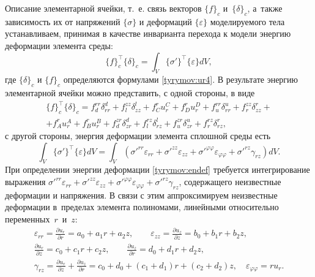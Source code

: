 Описание элементарной ячейки, т.~е. связь векторов $\{f\}_c$  и~$\{\delta\}_c$,  а~также зависимость их от напряжений $\{\sigma\}$ и деформаций $\{\varepsilon\}$  моделируемого тела устанавливаем,
принимая в качестве инварианта перехода к модели энергию деформации элемента среды:
\begin{equation}\label{tyrymov:fd}
    \{f\}_c^\top \{\delta\}_c=\int_V\{\sigma'\}^\top \{\varepsilon\}dV,
\end{equation}
где $\{\delta\}_c$  и $\{f\}_c$   определяются формулами
\eqref{tyrymov:ur4}. В результате энергию элементарной ячейки
можно представить, с одной стороны, в виде
\begin{multline}\label{tyrymov:energ}
   \{f\}_c^\top \{\delta\}_c=f_d^{rr}\delta_{rr}^d+f_l^{zz}\delta_{zz}^l+f_C^{r}u_{r}^C+f_D^{r}u_{r}^D+
   f_u^{rr}\delta_{rr}^u+f_r^{zz}\delta_{zz}^r+ \\
  +f_A^{r}u_{r}^A+f_B^{r}u_{r}^B+f_d^{zr}\delta_{zr}^d+f_l^{rz}\delta_{rz}^l+
   f_u^{zr}\delta_{zr}^u+f_r^{rz}\delta_{rz}^r,
\end{multline}
с другой стороны, энергия деформации элемента сплошной среды есть
\begin{equation}\label{tyrymov:endef}
    \int_V\{\sigma' \}^\top \{\varepsilon\}dV=\int_V\left(\sigma'^{rr}\varepsilon_{rr}+\sigma'^{zz}\varepsilon_{zz}+
    \sigma'^{\varphi\varphi}\varepsilon_{\varphi\varphi}+\sigma'^{rz}\gamma_{rz}\right)dV.
\end{equation}
При определении энергии деформации \eqref{tyrymov:endef} требуется
интегрирование выражения
$\sigma'^{rr}\varepsilon_{rr}+\sigma'^{zz}\varepsilon_{zz}+
    \sigma'^{\varphi\varphi}\varepsilon_{\varphi\varphi}+\sigma'^{rz}\gamma_{rz}$,
содержащего неизвестные деформации и напряжения. В связи с этим
аппроксимируем неизвестные деформации в~пределах элемента
полиномами, линейными относительно переменных~$r$~и~$z$:
\begin{equation}\label{tyrymov:aprxm}
    \begin{array}{c}
      \displaystyle \varepsilon_{rr}=\frac{\partial u_r}{\partial r}=a_0+a_1r+a_2z, \qquad
      \varepsilon_{zz}=\frac{\partial u_z}{\partial z}=b_0+b_1r+b_2z , \\[2mm]
       \displaystyle \frac{\partial u_r}{\partial z}=c_0+c_1r+c_2z, \qquad
      \frac{\partial u_z}{\partial r}=d_0+d_1r+d_2z, \\[2mm]
      \displaystyle \gamma_{rz}=\frac{\partial u_r}{\partial z}+\frac{\partial u_z}{\partial r}=
      c_0+d_0+(c_1+d_1)r+(c_2+d_2)z,\quad \varepsilon_{\varphi\varphi}=ru_r. \\
    \end{array}
\end{equation}
